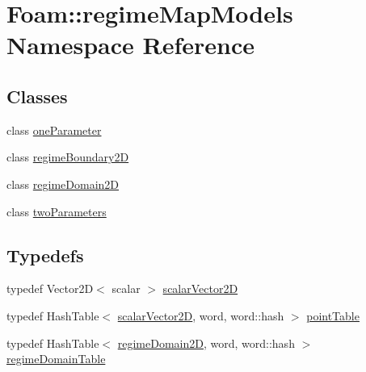 \hypertarget{namespaceFoam_1_1regimeMapModels}{}\section{Foam\+:\+:regime\+Map\+Models Namespace Reference}
\label{namespaceFoam_1_1regimeMapModels}
\subsection*{Classes}
\begin{DoxyCompactItemize}
\item 
class \hyperlink{classFoam_1_1regimeMapModels_1_1oneParameter}{one\+Parameter}
\item 
class \hyperlink{classFoam_1_1regimeMapModels_1_1regimeBoundary2D}{regime\+Boundary2D}
\item 
class \hyperlink{classFoam_1_1regimeMapModels_1_1regimeDomain2D}{regime\+Domain2D}
\item 
class \hyperlink{classFoam_1_1regimeMapModels_1_1twoParameters}{two\+Parameters}
\end{DoxyCompactItemize}
\subsection*{Typedefs}
\begin{DoxyCompactItemize}
\item 
typedef Vector2D$<$ scalar $>$ \hyperlink{namespaceFoam_1_1regimeMapModels_a08598bcd83623145f1ffa4ca0c48b685}{scalar\+Vector2D}
\item 
typedef Hash\+Table$<$ \hyperlink{namespaceFoam_1_1regimeMapModels_a08598bcd83623145f1ffa4ca0c48b685}{scalar\+Vector2D}, word, word\+::hash $>$ \hyperlink{namespaceFoam_1_1regimeMapModels_a61a0f10fd7bfaca55fbaaea5ed75d663}{point\+Table}
\item 
typedef Hash\+Table$<$ \hyperlink{classFoam_1_1regimeMapModels_1_1regimeDomain2D}{regime\+Domain2D}, word, word\+::hash $>$ \hyperlink{namespaceFoam_1_1regimeMapModels_a0eedb7f1fc49fe5af3debca17ff6686e}{regime\+Domain\+Table}
\end{DoxyCompactItemize}
